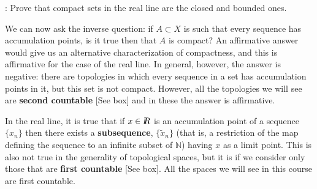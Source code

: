 \ejer: Prove that compact sets in the real line are the
closed and bounded ones.


We can now ask the inverse question: if $A \subset X$ is
such that every sequence has accumulation points, is it true
then that $A$ is compact? An affirmative answer would give us
an alternative characterization of compactness, and this is
affirmative for the case of the real line. In general, however, the answer is
negative: there are topologies in which every sequence in a
set has accumulation points in it, but this set is not
compact. However, all the topologies we will see are {\bf second countable} [See box] and in these
the answer is affirmative.

In the real line, it is true that if $x \in \mbox{\sl {l$\!\!\!\;\:\!$R}} $ is an accumulation point of a sequence $\{x_n\}$ then there exists a {\bf
subsequence}, $\{\tilde{x}_n\}$ (that is, a restriction of the
map defining the sequence to an infinite subset of $\mathbb{N}$) having $x$ as a limit point. This is also not
true in the generality of topological spaces, but it is if we consider only those that are {\bf first countable} [See box]. All the spaces we will see in this
course are first countable.

\espa 
\vfill   %

\espa

